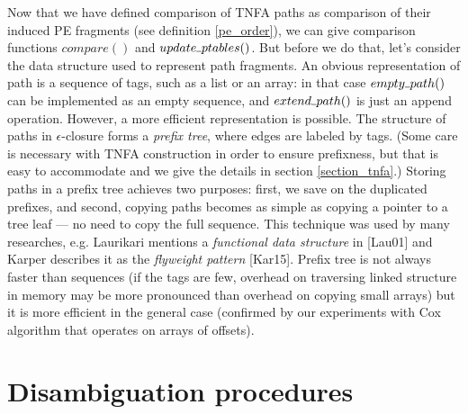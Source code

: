 \documentclass[AMA,STIX1COL]{WileyNJD-v2}
\newcommand{\Xund}{\rule{.4em}{.4pt}}
\begin{document}
Now that we have defined comparison of TNFA paths as comparison of their induced PE fragments
(see definition \ref{pe_order}),
we can give comparison functions $compare ()$ and $update \Xund ptables ()$.
But before we do that, let's consider the data structure used to represent path fragments.
An obvious representation of path is a sequence of tags, such as a list or an array:
in that case $empty \Xund path ()$ can be implemented as an empty sequence,
and $extend \Xund path ()$ is just an append operation.
However, a more efficient representation is possible.
The structure of paths in $\epsilon$-closure forms a \emph{prefix tree}, where edges are labeled by tags.
(Some care is necessary with TNFA construction in order to ensure prefixness,
but that is easy to accommodate and we give the details in section \ref{section_tnfa}.)
Storing paths in a prefix tree achieves two purposes:
first, we save on the duplicated prefixes,
and second, copying paths becomes as simple as copying a pointer to a tree leaf --- no need to copy the full sequence.
This technique was used by many researches, e.g. Laurikari mentions a \emph{functional data structure} in [Lau01]
and Karper describes it as the \emph{flyweight pattern} [Kar15].
Prefix tree is not always faster than sequences
(if the tags are few, overhead on traversing linked structure in memory
may be more pronounced than overhead on copying small arrays)
but it is more efficient in the general case
(confirmed by our experiments with Cox algorithm that operates on arrays of offsets).
\\

\section{Disambiguation procedures}\label{section_comparison}
\end{document}
